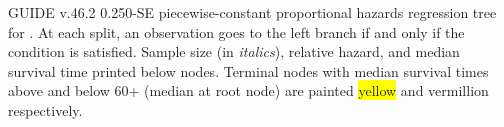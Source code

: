 \documentclass[12pt]{article}
\begin{document}
 \begin{center}
 \end{center}
GUIDE v.46.2 0.250-SE
piecewise-constant proportional hazards regression tree
for \texttt{}.
At each split, an observation goes to the left branch 
 if and only if the condition is satisfied.
Sample size (in \emph{italics}), relative hazard, and median survival time printed below nodes.
 Terminal nodes with median survival times above and below 60+ (median at root node) are painted \colorbox{yellow}{yellow} and \colorbox{vermillion}{vermillion} respectively.
 
\end{document}
